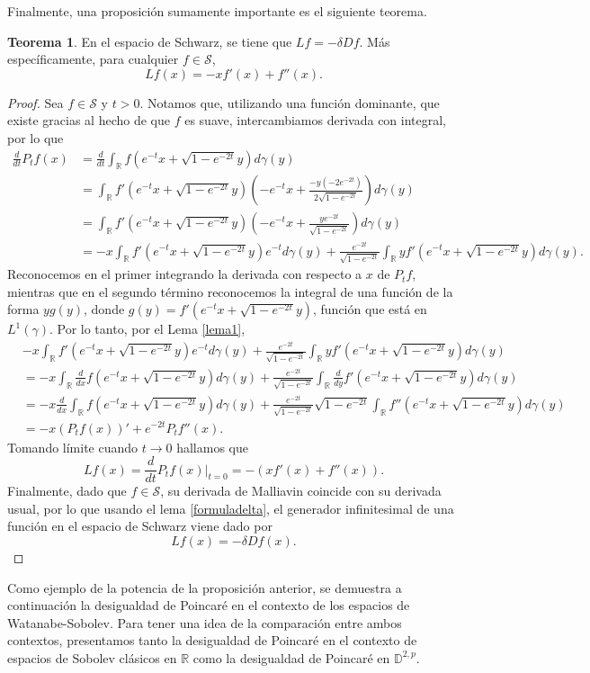 \documentclass[letterpaper,twoside,12pt]{book}
\newcommand{\R}{\mathbb{R}}
\newcommand{\D}{\mathbb{D}}
\renewcommand{\S}{\mathcal{S}}
\newcommand{\1}{\mathds{1}}
\renewcommand{\to}{\rightarrow}
\theoremstyle{definition}
\theoremstyle{definition}
\newtheorem{teo}{Teorema}
\theoremstyle{remark}
\theoremstyle{definition}
\theoremstyle{definition}
\theoremstyle{definition}
\theoremstyle{definition}
\theoremstyle{definition}
\begin{document}
Finalmente, una proposición sumamente importante es el siguiente teorema.
\begin{teo} 
En el espacio de Schwarz, se tiene que $Lf=-\delta Df$. Más específicamente, para cualquier $f\in \S$, 
\[
Lf(x)=-xf'(x)+f''(x).   
\]
\end{teo}
 \begin{proof} 
   Sea $f\in \S$ y $t>0$. Notamos que, utilizando una función dominante, que existe gracias al hecho de que $f$ es suave, intercambiamos derivada con integral, por lo que
   \begin{align*}
    \frac{d}{dt}P_tf(x)&=\frac{d}{dt}\int_\R f(e^{-t}x+\sqrt{1-e^{-2t}}y)d\gamma(y)\\
    &=\int_\R f'(e^{-t}x+\sqrt{1-e^{-2t}}y)\left(-e^{-t}x+\frac{-y(-2e^{-2t})}{2\sqrt{1-e^{-2t}}}\right)d\gamma(y)\\
    &=\int_\R f'(e^{-t}x+\sqrt{1-e^{-2t}}y)\left(-e^{-t}x+\frac{ye^{-2t}}{\sqrt{1-e^{-2t}}}\right)d\gamma(y)\\
    &=-x\int_\R f'(e^{-t}x+\sqrt{1-e^{-2t}}y)e^{-t}d\gamma(y)+\frac{e^{-2t}}{\sqrt{1-e^{-2t}}}\int_\R yf'(e^{-t}x+\sqrt{1-e^{-2t}}y)d\gamma(y).
   \end{align*}
   Reconocemos en el primer integrando la derivada con respecto a $x$ de $P_tf$, mientras que en el segundo término reconocemos la integral de una función de la forma $yg(y)$, donde $g(y)=f'(e^{-t}x+\sqrt{1-e^{-2t}}y)$, función que está en $L^1(\gamma)$. Por lo tanto, por el Lema \ref{lema1}, 
    \begin{align*}
        &-x\int_\R f'(e^{-t}x+\sqrt{1-e^{-2t}}y)e^{-t}d\gamma(y)+\frac{e^{-2t}}{\sqrt{1-e^{-2t}}}\int_\R yf'(e^{-t}x+\sqrt{1-e^{-2t}}y)d\gamma(y)\\
        &=-x\int_\R \frac{d}{dx}f(e^{-t}x+\sqrt{1-e^{-2t}}y)d\gamma(y)+\frac{e^{-2t}}{\sqrt{1-e^{-2t}}}\int_\R \frac{d}{dy}f'(e^{-t}x+\sqrt{1-e^{-2t}}y)d\gamma(y)\\
        &=-x\frac{d}{dx}\int_\R f(e^{-t}x+\sqrt{1-e^{-2t}}y)d\gamma(y)+\frac{e^{-2t}}{\sqrt{1-e^{-2t}}}\sqrt{1-e^{-2t}}\int_\R f''(e^{-t}x+\sqrt{1-e^{-2t}}y)d\gamma(y)\\
        &=-x(P_tf(x))'+e^{-2t}P_tf''(x).
    \end{align*}
    Tomando límite cuando $t\to0$ hallamos que 
    \[
    Lf(x)=\frac{d}{dt}P_tf(x)\bigg|_{t=0}=-\left(xf'(x)+f''(x)\right).
    \]
    Finalmente, dado que $f\in \S$, su derivada de Malliavin coincide con su derivada usual, por lo que usando el lema \ref{formuladelta}, el generador infinitesimal de una función en el espacio de Schwarz viene dado por 
    \[
    Lf(x)=-\delta Df(x).
    \]
  \end{proof}
Como ejemplo de la potencia de la proposición anterior, se demuestra a continuación la desigualdad de Poincaré en el contexto de los espacios de Watanabe-Sobolev.
Para tener una idea de la comparación entre ambos contextos, presentamos tanto la desigualdad de Poincaré en el contexto de espacios de Sobolev clásicos en $\R$ como la desigualdad de Poincaré en $\D^{2,p}$.
\end{document}
